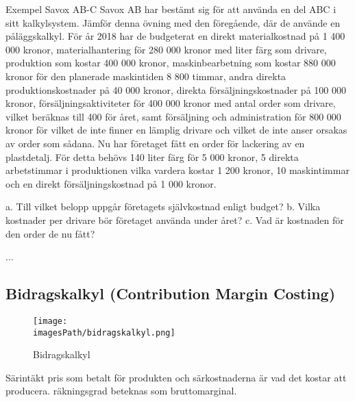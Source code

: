\documentclass{article}
\newcommand{\imagesPath}{images}
\begin{document}
\begin{exampleblock}{Exempel Savox AB-C}
    Savox AB har bestämt sig för att använda en del ABC i sitt kalkylsystem. Jämför 
    denna övning med den föregående, där de använde en påläggskalkyl. För år 2018 har de 
    budgeterat en direkt materialkostnad på 1 400 000 kronor, materialhantering för 280 000 
    kronor med liter färg som drivare, produktion som kostar 400 000 kronor, maskinbearbetning 
    som kostar 880 000 kronor för den planerade maskintiden 8 800 timmar, andra direkta 
    produktionskostnader på 40 000 kronor, direkta försäljningskostnader på 100 000 kronor, 
    försäljningsaktiviteter för 400 000 kronor med antal order som drivare, vilket beräknas till 400 för 
    året, samt försäljning och administration för 800 000 kronor för vilket de inte finner en lämplig 
    drivare och vilket de inte anser orsakas av order som sådana. Nu har företaget fått en order för 
    lackering av en plastdetalj. För detta behövs 140 liter färg för 5 000 kronor, 5 direkta arbetstimmar i 
    produktionen vilka vardera kostar 1 200 kronor, 10 maskintimmar och en direkt försäljningskostnad 
    på 1 000 kronor.

    a. Till vilket belopp uppgår företagets självkostnad enligt budget?
    b. Vilka kostnader per drivare bör företaget använda under året? 
    c. Vad är kostnaden för den order de nu fått? 

   ... %
\end{exampleblock}
%


\newpage
\subsection{Bidragskalkyl (Contribution Margin Costing)}
\begin{figure}[!h]
    \centering
    \texttt{[image: \\imagesPath/bidragskalkyl.png]}
    \caption{Bidragskalkyl}
\end{figure}
Särintäkt pris som betalt för produkten och särkostnaderna är vad det kostar att producera.
räkningsgrad beteknas som bruttomarginal.
\end{document}
